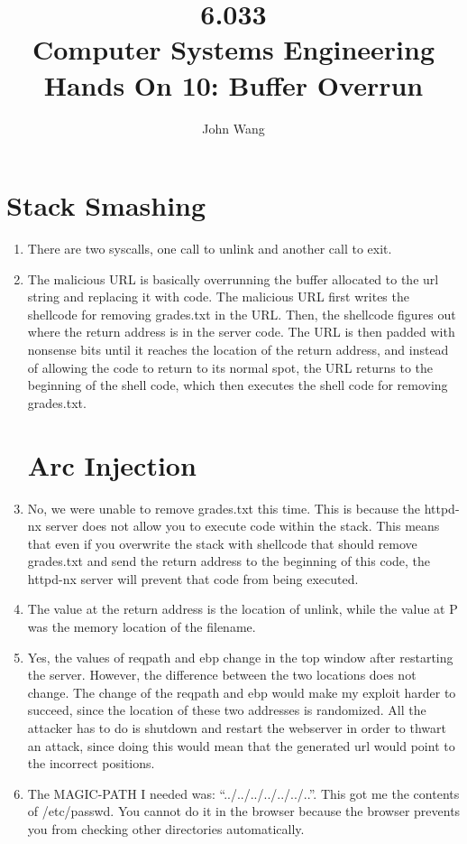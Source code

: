 \documentclass[psamsfonts]{amsart}
\title{6.033 \\
Computer Systems Engineering \\
Hands On 10: Buffer Overrun}
\author{John Wang}
\begin{document}
\maketitle

\section{Stack Smashing}

\begin{enumerate}
  \item There are two syscalls, one call to unlink and another call to exit.
  \item The malicious URL is basically overrunning the buffer allocated to the url string and replacing it with code. The malicious URL first writes the shellcode for removing grades.txt in the URL. Then, the shellcode figures out where the return address is in the server code. The URL is then padded with nonsense bits until it reaches the location of the return address, and instead of allowing the code to return to its normal spot, the URL returns to the beginning of the shell code, which then executes the shell code for removing grades.txt.
    \section{Arc Injection}
  \item No, we were unable to remove grades.txt this time. This is because the httpd-nx server does not allow you to execute code within the stack. This means that even if you overwrite the stack with shellcode that should remove grades.txt and send the return address to the beginning of this code, the httpd-nx server will prevent that code from being executed.
  \item The value at the return address is the location of unlink, while the value at P was the memory location of the filename.
  \item Yes, the values of reqpath and ebp change in the top window after restarting the server. However, the difference between the two locations does not change. The change of the reqpath and ebp would make my exploit harder to succeed, since the location of these two addresses is randomized. All the attacker has to do is shutdown and restart the webserver in order to thwart an attack, since doing this would mean that the generated url would point to the incorrect positions.
  \item The MAGIC-PATH I needed was: ``../../../../../../..''. This got me the contents of /etc/passwd. You cannot do it in the browser because the browser prevents you from checking other directories automatically.
\end{enumerate}
\end{document}
